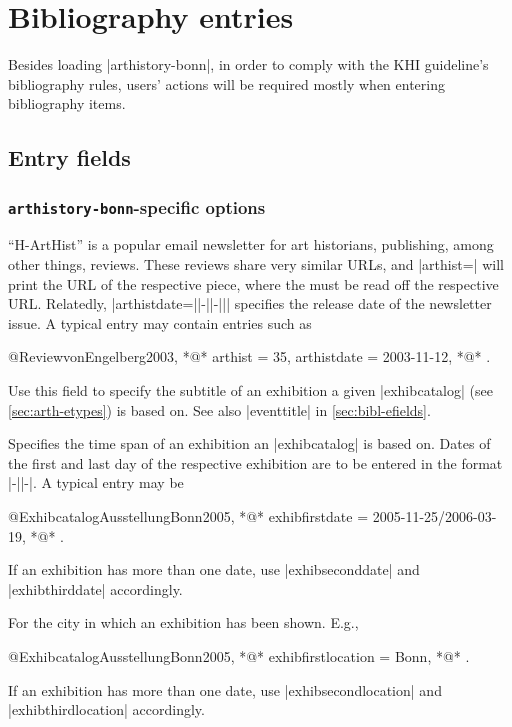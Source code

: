 \documentclass[a4paper,
10pt,
ngerman,
english
]{ltxdoc}
\begin{document}
\section{Bibliography entries}
Besides loading |arthistory-bonn|, in order to comply with the KHI guideline's bibliography rules, users' actions will be required mostly when entering bibliography items.

\subsection{Entry fields}

\subsubsection{\texttt{arthistory-bonn}-specific options}

\enquote{H-ArtHist} is a popular email newsletter for art historians, publishing, among other things, reviews. These reviews share very similar URLs, and |arthist=| will print the URL of the respective piece, where the  must be read off the respective URL.
Relatedly, |arthistdate={||-||-||}| specifies the release date of the newsletter issue. A typical entry may contain entries such as
\begin{code}
@Review{vonEngelberg2003,
  *@\ldots@*
  arthist      = {35},
  arthistdate  = {2003-11-12},
  *@\ldots@*
}.
\end{code}

Use this field to specify the subtitle of an exhibition a given |exhibcatalog| (see \cref{sec:arth-etypes}) is based on. See also |eventtitle| in \cref{sec:bibl-efields}.

Specifies the time span of an exhibition an |exhibcatalog| is based on. Dates of the first and last day of the respective exhibition are to be entered in the format |-||-|. A typical entry may be
\begin{code}
@Exhibcatalog{AusstellungBonn2005,
  *@\ldots@*
  exhibfirstdate = {2005-11-25/2006-03-19},
  *@\ldots@*
}.
\end{code}
If an exhibition has more than one date, use |exhibseconddate| and |exhibthirddate| accordingly.

For the city in which an exhibition has been shown. E.g.,
\begin{code}
@Exhibcatalog{AusstellungBonn2005,
  *@\ldots@*
  exhibfirstlocation = {Bonn},
  *@\ldots@*
}.
\end{code}
If an exhibition has more than one date, use |exhibsecondlocation| and |exhibthirdlocation| accordingly.
\end{document}
